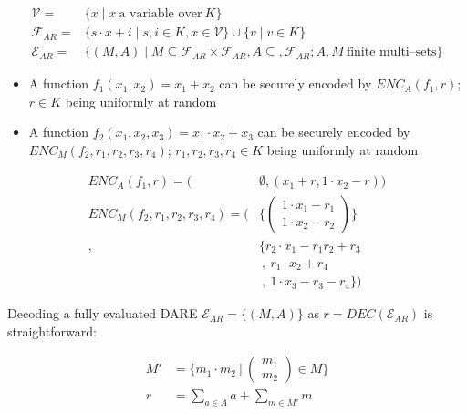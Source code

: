 \begin{align*}
  \mathcal{V} = & \{ x \mid x~\text{a variable over}~K \} \\
%
  \mathcal{F}_{AR} = & \{ s \cdot x + i \mid s, i \in K, x \in \mathcal{V} \}
  \cup \{ v \mid v \in K \} \\
%
  \mathcal{E}_{AR} = & \{ (M, A) \mid
    M \subseteq \mathcal{F}_{AR} \times \mathcal{F}_{AR},
    A \subseteq, \mathcal{F}_{AR};
    A, M~\text{finite multi--sets} \}
%
\end{align*}


\label{sec:affinization_encoding}

\begin{itemize}

\item A function $f_1(x_1, x_2) = x_1 + x_2$ can be securely encoded by
$ENC_A(f_1, r)$; $r \in K$ being uniformly at random

\item A function $f_2(x_1, x_2, x_3) = x_1 \cdot x_2 + x_3$ can be securely
encoded by $ENC_M(f_2, r_1, r_2, r_3, r_4)$; $r_1, r_2, r_3, r_4 \in K$ being
uniformly at random
\end{itemize}

\begin{align*}
ENC_A(f_1, r) = \Big( & \emptyset, (x_1 + r, 1 \cdot x_2 - r)\Big) \\
ENC_M(f_2,  r_1, r_2, r_3, r_4) = \Bigg( & \bigg\{
\begin{pmatrix}1 \cdot x_1 - r_1\\1 \cdot x_2 - r_2\end{pmatrix} \bigg\}\\
,& \bigg\{r_2 \cdot x_1 -r_1r_2+r_3 \\
&\ ,\ r_1 \cdot x_2 + r_4 \\
&\ ,\ 1 \cdot x_3-r_3-r_4\bigg\} \Bigg)
\end{align*}


\label{sec:affinization_decoding}

Decoding a fully evaluated DARE $\mathcal{E}_{AR} = \{(M,A)\}$ as $r =
DEC(\mathcal{E}_{AR})$ is
straightforward:

\begin{align*}
M' &= \Bigg\{ m_1 \cdot m_2\ \Bigg|\ \begin{pmatrix}m_1\\m_2\end{pmatrix}
\in M \Bigg\} \\
r & = \sum_{a \in A} a + \sum_{m \in M'} m
\end{align*}


